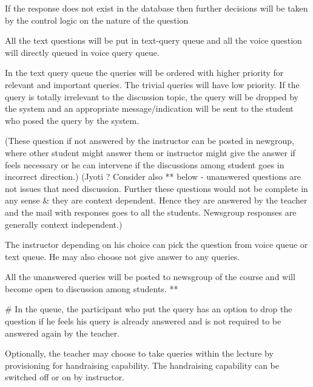 \documentclass{article}
\begin{document}
\begin{enumerate}
\begin{enumerate}
If the response does not exist in the database then further decisions will be taken by the control logic on the nature of the question 

All the text questions will be put in text-query queue and all the voice question will directly queued in voice query queue. 
 
In the text query queue the queries will  be ordered with higher priority for relevant and important queries. The trivial queries will have low priority. If the query is totally irrelevant to the discussion topic, the query will be dropped by the system and an appropriate message/indication will be sent to the student who posed the query by the system. 
 
(These question if not answered by the instructor can be posted in newgroup, where other student might answer them or instructor might give the answer if feels necessary or he can intervene if the discussions among student goes in incorrect direction.) (Jyoti ? Consider also ** below - unanswered questions are not issues that need discussion. Further these questions would not be complete in any sense \& they are context dependent. Hence they are answered by the teacher and the mail with responses goes to all the students. Newsgroup responses are generally context independent.)   

The instructor depending on his choice can pick the question from voice queue or text queue. He may also choose not give answer to any queries.  
 
All the unanswered queries will be posted to newsgroup of the course and will become open to discussion among students. ** 
 
\# 
In the queue, the participant who put the query has an option to drop the question if he feels his query is already answered and is not required to be answered again by the teacher.  
 
Optionally, the teacher may choose to take queries within the lecture by provisioning for handraising capability. The handraising capability can be switched off or on by instructor. 
\begin{center}

\label{figure:brihSync_Query_hendling_pro.latex}
\end{center}
\end{enumerate}

\end{enumerate}
\end{document}
